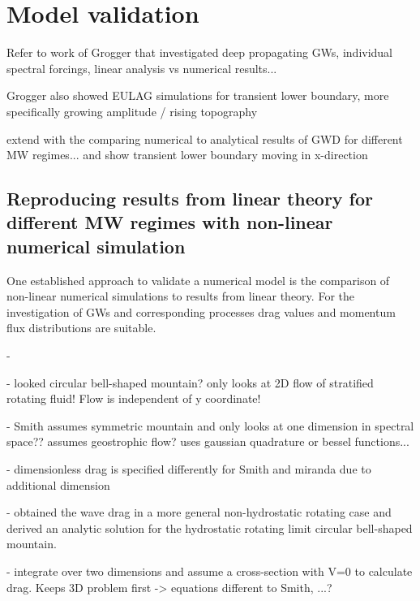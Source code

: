 \chapter{Model validation}

Refer to work of Grogger that investigated deep propagating GWs, individual spectral forcings, linear analysis vs numerical results...

Grogger also showed EULAG simulations for transient lower boundary, more specifically growing amplitude / rising topography 

extend with the comparing numerical to analytical results of GWD for different MW regimes...
and show transient lower boundary moving in x-direction


\section{Reproducing results from linear theory for different MW regimes with non-linear numerical simulation}


One established approach to validate a numerical model is the comparison of non-linear numerical simulations to results from linear theory. For the investigation of GWs and corresponding processes drag values and momentum flux distributions are suitable.


- \textcite{bretherton_momentum_1969}

- \textcite{smith_influence_1979} looked circular bell-shaped mountain? only looks at 2D flow of stratified rotating fluid! Flow is independent of y coordinate! 

- Smith assumes symmetric mountain and only looks at one dimension in spectral space?? assumes geostrophic flow? uses gaussian quadrature or bessel functions...

- dimensionless drag is specified differently for Smith and miranda due to additional dimension

- \textcite{miranda_non-linear_1992} obtained the wave drag in a more general non-hydrostatic rotating case and derived an analytic solution for the hydrostatic rotating limit circular bell-shaped mountain. 

- integrate over two dimensions and assume a cross-section with V=0 to calculate drag. Keeps 3D problem first -> equations different to Smith, ...?

